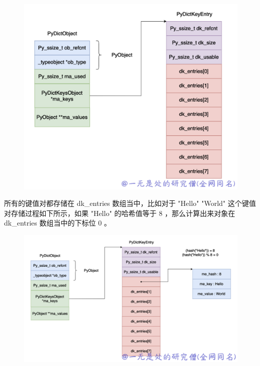     \begin{figure}[h]
        \centering
            \includegraphics[scale=.25]{images/31-bytes.png}
						\caption{ }
        \label{fig:my_label}
    \end{figure}
    
所有的键值对都存储在 dk\_entries 数组当中，比如对于 "Hello" "World" 这个键值对存储过程如下所示，如果 "Hello" 的哈希值等于 8 ，那么计算出来对象在 dk\_entries 数组当中的下标位 0 。

    \begin{figure}[h]
        \centering
            \includegraphics[scale=.25]{images/32-dict.png}
						\caption{ }
        \label{fig:my_label}
    \end{figure}
    
